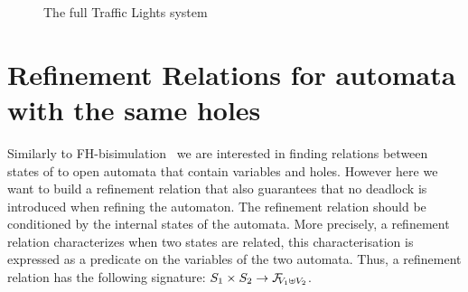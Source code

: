 \documentclass[runningheads]{llncs}
\begin{document}
\begin{figure}[!tb]
\centering
\scalebox{.75}{}
\caption{The full Traffic Lights system}
\label{fig:tlf}
\end{figure}

\section{Refinement Relations for automata with the same holes}\label{sec:refinement}

Similarly to FH-bisimulation~\cite{fhbisim} we are interested  in finding relations between states of to open automata that contain variables and holes. However here we want to build a refinement relation that  also guarantees that no deadlock is introduced when refining the automaton.
The refinement relation should be conditioned by the internal states of the automata. More precisely, a refinement relation characterizes when two states are related, this  characterisation is expressed as a predicate on the variables of the two automata.
Thus, a refinement relation has the following signature: \( S_1 \times S_2 \to \rformulas[V_1 \uplus V_2]\).
\end{document}
